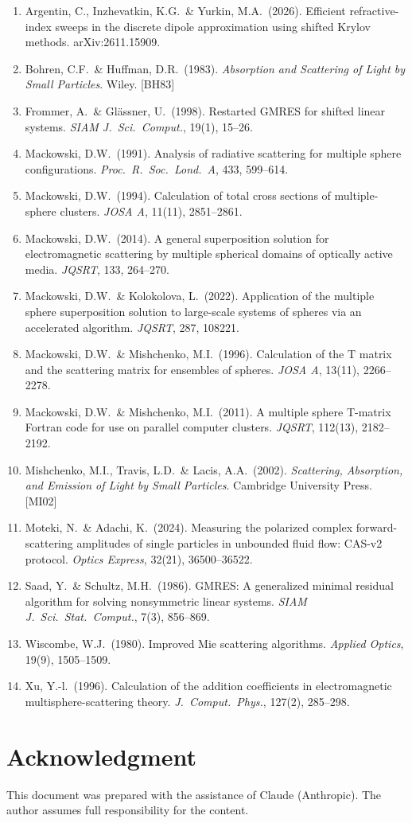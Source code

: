 \documentclass[11pt,a4paper]{article}
\begin{document}
\begin{enumerate}[nosep]
  \item Argentin, C., Inzhevatkin, K.G.\ \& Yurkin, M.A.\ (2026). Efficient refractive-index sweeps in the discrete dipole approximation using shifted Krylov methods. arXiv:2611.15909.
  \item Bohren, C.F.\ \& Huffman, D.R.\ (1983). \textit{Absorption and Scattering of Light by Small Particles}. Wiley. [BH83]
  \item Frommer, A.\ \& Gl\"assner, U.\ (1998). Restarted GMRES for shifted linear systems. \textit{SIAM J.\ Sci.\ Comput.}, 19(1), 15--26.
  \item Mackowski, D.W.\ (1991). Analysis of radiative scattering for multiple sphere configurations. \textit{Proc.\ R.\ Soc.\ Lond.\ A}, 433, 599--614.
  \item Mackowski, D.W.\ (1994). Calculation of total cross sections of multiple-sphere clusters. \textit{JOSA A}, 11(11), 2851--2861.
  \item Mackowski, D.W.\ (2014). A general superposition solution for electromagnetic scattering by multiple spherical domains of optically active media. \textit{JQSRT}, 133, 264--270.
  \item Mackowski, D.W.\ \& Kolokolova, L.\ (2022). Application of the multiple sphere superposition solution to large-scale systems of spheres via an accelerated algorithm. \textit{JQSRT}, 287, 108221.
  \item Mackowski, D.W.\ \& Mishchenko, M.I.\ (1996). Calculation of the T matrix and the scattering matrix for ensembles of spheres. \textit{JOSA A}, 13(11), 2266--2278.
  \item Mackowski, D.W.\ \& Mishchenko, M.I.\ (2011). A multiple sphere T-matrix Fortran code for use on parallel computer clusters. \textit{JQSRT}, 112(13), 2182--2192.
  \item Mishchenko, M.I., Travis, L.D.\ \& Lacis, A.A.\ (2002). \textit{Scattering, Absorption, and Emission of Light by Small Particles}. Cambridge University Press. [MI02]
  \item Moteki, N.\ \& Adachi, K.\ (2024). Measuring the polarized complex forward-scattering amplitudes of single particles in unbounded fluid flow: CAS-v2 protocol. \textit{Optics Express}, 32(21), 36500--36522.
  \item Saad, Y.\ \& Schultz, M.H.\ (1986). GMRES: A generalized minimal residual algorithm for solving nonsymmetric linear systems. \textit{SIAM J.\ Sci.\ Stat.\ Comput.}, 7(3), 856--869.
  \item Wiscombe, W.J.\ (1980). Improved Mie scattering algorithms. \textit{Applied Optics}, 19(9), 1505--1509.
  \item Xu, Y.-l.\ (1996). Calculation of the addition coefficients in electromagnetic multisphere-scattering theory. \textit{J.\ Comput.\ Phys.}, 127(2), 285--298.
\end{enumerate}

\section*{Acknowledgment}
This document was prepared with the assistance of Claude (Anthropic).
The author assumes full responsibility for the content.
\end{document}
